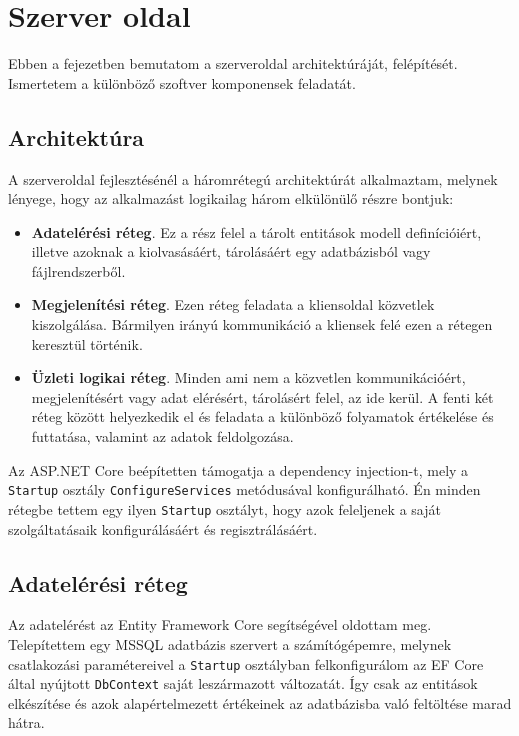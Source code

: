 \chapter{Szerver oldal}
\label{chapt:birdmap-backend}
Ebben a fejezetben bemutatom a szerveroldal architektúráját, felépítését. Ismertetem a különböző szoftver komponensek feladatát.

\section{Architektúra}
A szerveroldal fejlesztésénél a háromrétegú architektúrát alkalmaztam, melynek lényege, hogy az alkalmazást logikailag három elkülönülő részre bontjuk:
\begin{itemize}
    \item \textbf{Adatelérési réteg}. Ez a rész felel a tárolt entitások modell definícióiért, illetve azoknak a kiolvasásáért, tárolásáért egy adatbázisból vagy fájlrendszerből.
    \item \textbf{Megjelenítési réteg}. Ezen réteg feladata a kliensoldal közvetlek kiszolgálása. Bármilyen irányú kommunikáció a kliensek felé ezen a rétegen keresztül történik.
    \item \textbf{Üzleti logikai réteg}. Minden ami nem a közvetlen kommunikációért, megjelenítésért vagy adat elérésért, tárolásért felel, az ide kerül.
    A fenti két réteg között helyezkedik el és feladata a különböző folyamatok értékelése és futtatása, valamint az adatok feldolgozása.
\end{itemize}

Az ASP.NET Core beépítetten támogatja a dependency injection-t, mely a \verb+Startup+ osztály \verb+ConfigureServices+ metódusával konfigurálható.
Én minden rétegbe tettem egy ilyen \verb+Startup+ osztályt, hogy azok feleljenek a saját szolgáltatásaik konfigurálásáért és regisztrálásáért.

\section{Adatelérési réteg}
Az adatelérést az Entity Framework Core segítségével oldottam meg. Telepítettem egy MSSQL adatbázis szervert a számítógépemre, melynek csatlakozási paramétereivel
a \verb+Startup+ osztályban felkonfigurálom az EF Core által nyújtott \verb+DbContext+ saját leszármazott változatát. 
Így csak az entitások elkészítése és azok alapértelmezett értékeinek az adatbázisba való feltöltése marad hátra.

